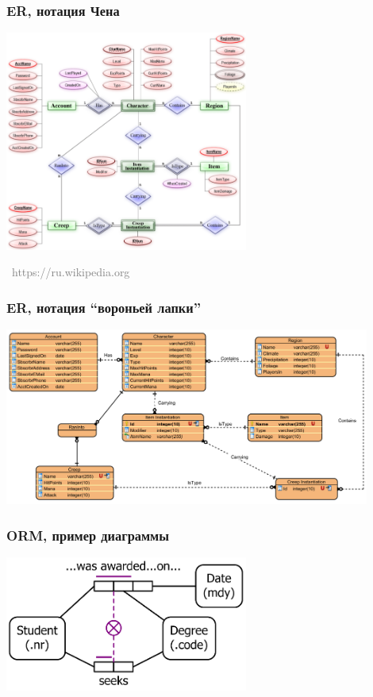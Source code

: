 \documentclass[xetex,mathserif,serif]{beamer}
\newcommand{\attribution}[1] {
	\vspace{-5mm}\begin{flushright}\begin{scriptsize}\textcolor{gray}{\textcopyright\, #1}\end{scriptsize}\end{flushright}
}
\begin{document}
	\begin{frame}
		\frametitle{ER, нотация Чена}
		\begin{center}
			\includegraphics[width=0.6\textwidth]{erChenNotation.png}
			\attribution{https://ru.wikipedia.org}
		\end{center}
	\end{frame}

	\begin{frame}
		\frametitle{ER, нотация ``вороньей лапки''}
		\begin{center}
			\includegraphics[width=0.9\textwidth]{erCrowsFoot.png}
		\end{center}
	\end{frame}

	\begin{frame}
		\frametitle{ORM, пример диаграммы}
		\begin{center}
			\includegraphics[width=0.6\textwidth]{orm.png}
		\end{center}
	\end{frame}
\end{document}
